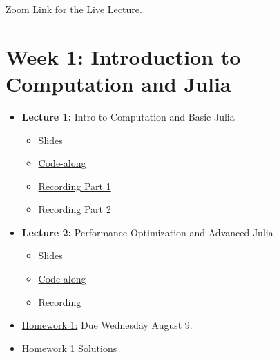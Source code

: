 \documentclass[
]{book}
\providecommand{\tightlist}{%
  \setlength{\itemsep}{0pt}\setlength{\parskip}{0pt}}
\begin{document}
\href{https://uwmadison.zoom.us/j/93415370734?pwd=V1l1TmdmV2lYYUNkTk5rQmdiZU9Wdz09}{Zoom Link for the Live Lecture}.

\hypertarget{week-1-introduction-to-computation-and-julia-1}{%
\section{Week 1: Introduction to Computation and Julia}\label{week-1-introduction-to-computation-and-julia-1}}

\begin{itemize}
\tightlist
\item
  \textbf{Lecture 1:} Intro to Computation and Basic Julia

  \begin{itemize}
  \tightlist
  \item
    \href{https://kevinghunt.github.io/ComputationCamp/lectures/Lecture1.html}{Slides}
  \item
    \href{https://kevinghunt.github.io/ComputationCamp/codealongs/CodeAlong1.jl}{Code-along}
  \item
    \href{https://uwmadison.zoom.us/rec/share/YbH5nwK8MFfdrG_79ab21fIChvq_GLK2G0cj1PuRpy29LgDW2ddl46KoGUvMzWoz.uN0dl820cFXMQ54_}{Recording Part 1}
  \item
    \href{https://uwmadison.zoom.us/rec/share/grQK03ljFWrQB5hBKKgoAVy9BuR5hg85PgyVvQJrXqJ5olG1fCe9vh336wh_L_yH.8-wkiBg4GIsDT3eC}{Recording Part 2}
  \end{itemize}
\item
  \textbf{Lecture 2:} Performance Optimization and Advanced Julia

  \begin{itemize}
  \tightlist
  \item
    \href{https://kevinghunt.github.io/ComputationCamp/lectures/Lecture2.html}{Slides}
  \item
    \href{https://kevinghunt.github.io/ComputationCamp/codealongs/CodeAlong2.jl}{Code-along}
  \item
    \href{https://uwmadison.zoom.us/rec/share/ANmR1Qr-iDoAxMOItHY9zgQk41_bbABcPN4eD3mVE5OVLvhzcXr80yBSEjEi8Dc.V7Hy_3yeHQm84srl}{Recording}
  \end{itemize}
\item
  \href{https://kevinghunt.github.io/ComputationCamp/homeworks/homework1.html}{Homework 1:} Due Wednesday August 9.
\item
  \href{https://kevinghunt.github.io/ComputationCamp/homework_solutions/Homework1_solutions.jl}{Homework 1 Solutions}
\end{itemize}
\end{document}
